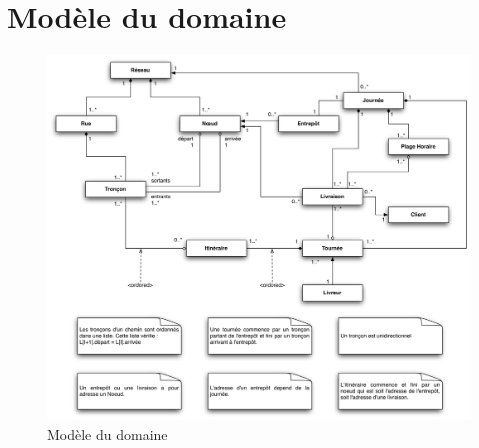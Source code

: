 \chapter{Mod\`ele du domaine}

\begin{figure}[h]
    \centering
    \includegraphics[width=140mm]{../diagrams/domain_model/domaine.png}
    \caption{Mod\`ele du domaine}
    \label{diagram:domaine}
\end{figure}
